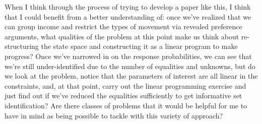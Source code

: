 \documentclass[11pt]{article}
\begin{document}
When I think through the process of 
trying to develop a paper like this, I think that 
I could benefit from a better understanding 
of: once we've realized that 
we can group income and restrict the types of movement 
via revealed preference arguments,
what qualities of the problem at this point make 
us think about re-structuring the state space 
and constructing it as a linear program
to make progress?
Once we've narrowed in on the response probabilities, 
we can see that we're still under-identified 
due to the number of equalities and unknowns, 
but do we look at the problem, notice
that the parameters of interest are all 
linear in the constraints, and, at that point, 
carry out the linear programming exercise
and just find out if we've reduced the 
equalities sufficiently
to get informative set identification?
Are there classes of problems that 
it would be helpful for me to have in mind
as being possible to 
tackle with this variety of approach?
\end{document}
